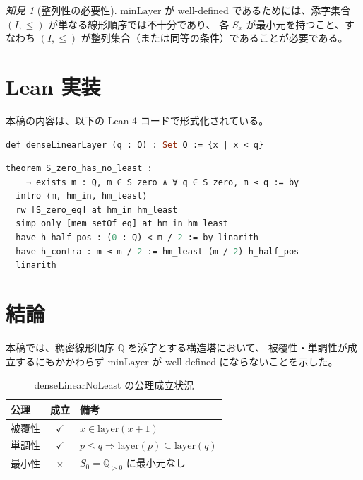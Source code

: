 \documentclass[a4paper,11pt]{ltjsarticle}
\theoremstyle{definition}
\theoremstyle{plain}
\theoremstyle{remark}
\newtheorem{insight}[definition]{知見}
\newcommand{\Q}{\mathbb{Q}}
\newcommand{\Layer}{\mathrm{layer}}
\newcommand{\minLayer}{\mathrm{minLayer}}
\begin{document}
\begin{insight}[整列性の必要性]
$\minLayer$ が well-defined であるためには、添字集合 $(I, \leq)$ が単なる線形順序では不十分であり、
各 $S_x$ が最小元を持つこと、すなわち $(I, \leq)$ が整列集合（または同等の条件）であることが必要である。
\end{insight}

\section{Lean 実装}

本稿の内容は、以下の Lean 4 コードで形式化されている。

\begin{lstlisting}[language=ML, caption={denseLinearLayer の定義}]
def denseLinearLayer (q : Q) : Set Q := {x | x < q}
\end{lstlisting}

\begin{lstlisting}[language=ML, caption={$S_0$ に最小元がないことの証明}]
theorem S_zero_has_no_least : 
    ¬ exists m : Q, m ∈ S_zero ∧ ∀ q ∈ S_zero, m ≤ q := by
  intro ⟨m, hm_in, hm_least⟩
  rw [S_zero_eq] at hm_in hm_least
  simp only [mem_setOf_eq] at hm_in hm_least
  have h_half_pos : (0 : Q) < m / 2 := by linarith
  have h_contra : m ≤ m / 2 := hm_least (m / 2) h_half_pos
  linarith
\end{lstlisting}

\section{結論}

本稿では、稠密線形順序 $\Q$ を添字とする構造塔において、
被覆性・単調性が成立するにもかかわらず $\minLayer$ が well-defined にならないことを示した。

\begin{table}[htbp]
\centering
\caption{denseLinearNoLeast の公理成立状況}
\small
\begin{tabular}{|l|c|l|}
\hline
\textbf{公理} & \textbf{成立} & \textbf{備考} \\
\hline
被覆性 & $\checkmark$ & $x \in \Layer(x+1)$ \\
単調性 & $\checkmark$ & $p \leq q \Rightarrow \Layer(p) \subseteq \Layer(q)$ \\
最小性 & $\times$ & $S_0 = \Q_{>0}$ に最小元なし \\
\hline
\end{tabular}
\end{table}
\end{document}
